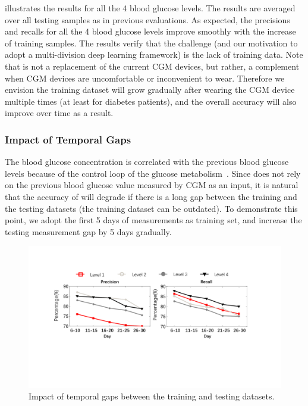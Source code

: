  illustrates the results for all the 4 blood glucose levels.
The results are averaged over all testing samples as in previous evaluations.
As expected, the precisions and recalls for all the 4 blood glucose levels improve smoothly with the increase of training samples.
The results verify that the challenge (and our motivation to adopt a multi-division deep learning framework) is the lack of training data.
Note that \sysname is not a replacement of the current CGM devices, but rather, a complement when CGM devices are uncomfortable or inconvenient to wear.
Therefore we envision the training dataset will grow gradually after wearing the CGM device multiple times (at least for diabetes patients), and the overall accuracy will also improve over time as a result.



\subsubsection{Impact of Temporal Gaps}
The blood glucose concentration is correlated with the previous blood glucose levels because of the control loop of the glucose metabolism~\cite{bib:TBE07:Dalla, bib:PE04:Hovorka, bib:IJNMBE16:Oviedo}.
Since \sysname does not rely on the previous blood glucose value measured by CGM as an input, it is natural that the accuracy of \sysname will degrade if there is a long gap between the training and the testing datasets (\ie the training dataset can be outdated). \textcolor[rgb]{1.00,0.00,0.00}{To demonstrate this point, we adopt the first 5 days of measurements as training set, and increase the testing measurement gap  by 5 days gradually.}

\begin{figure}[h]
  \centering
  \includegraphics[width=0.9\columnwidth]{./img/Performance_gap2.pdf}
  \caption{Impact of temporal gaps between the training and testing datasets.}
  \label{fig:per_under_various_pred_days}
\end{figure}

